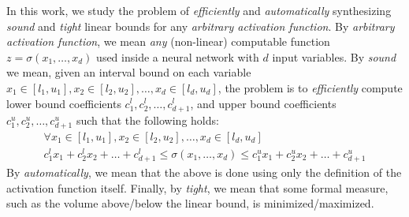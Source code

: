 



In this work, we study the problem of \textit{efficiently} and
\textit{automatically}
synthesizing \textit{sound} and \textit{tight} linear bounds for any
\textit{arbitrary activation function}.
%
By \emph{arbitrary activation function}, we mean \textit{any} (non-linear)
computable function $ z = \sigma(x_1,\dots,x_d) $ used inside a neural network
with $ d $ input variables.
%
By \textit{sound} we mean, given an interval bound on each
variable $ x_1 \in
[l_1, u_1], x_2 \in [l_2, u_2], \dots, x_d \in [l_d, u_d]$, the problem is to \textit{efficiently}
compute lower bound coefficients $ c^l_1, c^l_2, \dots, c^l_{d+1} $, and upper
bound coefficients $ c^u_1, c^u_2, \dots, c^u_{d+1} $ such that the following
holds:
\begin{equation}\label{onlinesyn:eq:intro-sound}
\begin{gathered}
	\forall x_1 \in [l_1, u_1], x_2 \in [l_2, u_2], \dots,  x_d \in [l_d, u_d]\\
	c^l_1x_1 + c^l_2x_2 + \dots + c^l_{d+1}
	\leq \sigma(x_1,\dots,x_d) \leq
	c^u_1x_1 + c^u_2x_2 + \dots + c^u_{d+1}
\end{gathered}
\end{equation}
%
By \textit{automatically}, we mean that the above is done using only the
definition of the activation function itself.
%
Finally, by \textit{tight}, we mean that some formal measure, such as the
volume above/below the linear bound, is minimized/maximized.

